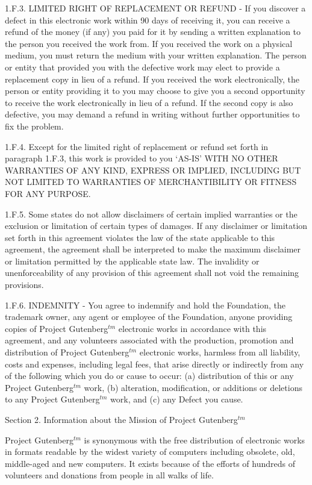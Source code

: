 1.F.3.  LIMITED RIGHT OF REPLACEMENT OR REFUND - If you discover a
defect in this electronic work within 90 days of receiving it, you can
receive a refund of the money (if any) you paid for it by sending a
written explanation to the person you received the work from.  If you
received the work on a physical medium, you must return the medium with
your written explanation.  The person or entity that provided you with
the defective work may elect to provide a replacement copy in lieu of a
refund.  If you received the work electronically, the person or entity
providing it to you may choose to give you a second opportunity to
receive the work electronically in lieu of a refund.  If the second copy
is also defective, you may demand a refund in writing without further
opportunities to fix the problem.

1.F.4.  Except for the limited right of replacement or refund set forth
in paragraph 1.F.3, this work is provided to you ‘AS-IS’ WITH NO OTHER
WARRANTIES OF ANY KIND, EXPRESS OR IMPLIED, INCLUDING BUT NOT LIMITED TO
WARRANTIES OF MERCHANTIBILITY OR FITNESS FOR ANY PURPOSE.

1.F.5.  Some states do not allow disclaimers of certain implied
warranties or the exclusion or limitation of certain types of damages.
If any disclaimer or limitation set forth in this agreement violates the
law of the state applicable to this agreement, the agreement shall be
interpreted to make the maximum disclaimer or limitation permitted by
the applicable state law.  The invalidity or unenforceability of any
provision of this agreement shall not void the remaining provisions.

1.F.6.  INDEMNITY - You agree to indemnify and hold the Foundation, the
trademark owner, any agent or employee of the Foundation, anyone
providing copies of Project Gutenberg$^{tm}$ electronic works in accordance
with this agreement, and any volunteers associated with the production,
promotion and distribution of Project Gutenberg$^{tm}$ electronic works,
harmless from all liability, costs and expenses, including legal fees,
that arise directly or indirectly from any of the following which you do
or cause to occur: (a) distribution of this or any Project Gutenberg$^{tm}$
work, (b) alteration, modification, or additions or deletions to any
Project Gutenberg$^{tm}$ work, and (c) any Defect you cause.


Section  2.  Information about the Mission of Project Gutenberg$^{tm}$

Project Gutenberg$^{tm}$ is synonymous with the free distribution of
electronic works in formats readable by the widest variety of computers
including obsolete, old, middle-aged and new computers.  It exists
because of the efforts of hundreds of volunteers and donations from
people in all walks of life.

